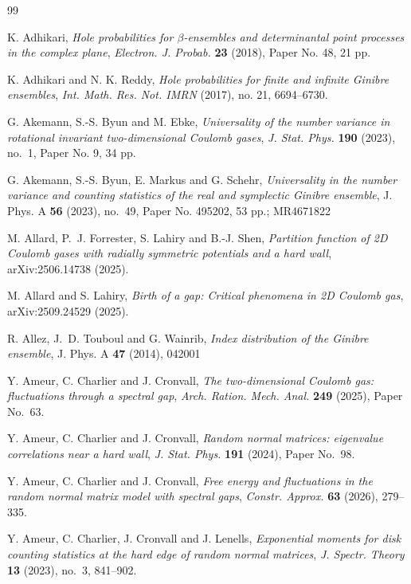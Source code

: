 \documentclass[a4paper]{article}
\numberwithin{equation}{section}
\begin{document}
\footnotesize
\begin{thebibliography}{99}

 K. Adhikari, \emph{Hole probabilities for $\beta$-ensembles and determinantal point processes in the complex plane}, \textit{Electron. J. Probab.} \textbf{23} (2018), Paper No. 48, 21 pp.

 K. Adhikari and N. K. Reddy, \emph{Hole probabilities for finite and infinite Ginibre ensembles}, \textit{Int. Math. Res. Not. IMRN} (2017), no. 21, 6694--6730.

 G. Akemann, S.-S. Byun and M. Ebke, \emph{Universality of the number variance in rotational invariant two-dimensional Coulomb gases}, \textit{J. Stat. Phys.} \textbf{190} (2023), no.~1, Paper No. 9, 34 pp.

G. Akemann, S.-S. Byun, E. Markus and G. Schehr, \emph{Universality in the number variance and counting statistics of the real and symplectic Ginibre ensemble}, J. Phys. A {\bf 56} (2023), no.~49, Paper No. 495202, 53 pp.; MR4671822

M. Allard, P.~J. Forrester, S. Lahiry and B.-J. Shen,
\emph{Partition function of 2D Coulomb gases with radially symmetric potentials and a hard wall},
arXiv:2506.14738 (2025).

M. Allard and S. Lahiry,
\emph{Birth of a gap: Critical phenomena in 2D Coulomb gas},
arXiv:2509.24529 (2025).

R. Allez, J.~D. Touboul and G. Wainrib, \emph{Index distribution of the Ginibre ensemble}, J. Phys. A {\bf 47} (2014), 042001

Y. Ameur, C. Charlier and J. Cronvall,
\emph{The two-dimensional Coulomb gas: fluctuations through a spectral gap},
\textit{Arch. Ration. Mech. Anal.} \textbf{249} (2025), Paper No.~63.

Y. Ameur, C. Charlier and J. Cronvall,
\emph{Random normal matrices: eigenvalue correlations near a hard wall},
\textit{J. Stat. Phys.} \textbf{191} (2024), Paper No.~98.

Y. Ameur, C. Charlier and J. Cronvall,
\emph{Free energy and fluctuations in the random normal matrix model with spectral gaps},
\textit{Constr. Approx.} \textbf{63} (2026), 279--335.

Y. Ameur, C. Charlier, J. Cronvall and J. Lenells,
\emph{Exponential moments for disk counting statistics at the hard edge of random normal matrices},
\textit{J. Spectr. Theory} \textbf{13} (2023), no.~3, 841--902.


\end{thebibliography}
\end{document}
